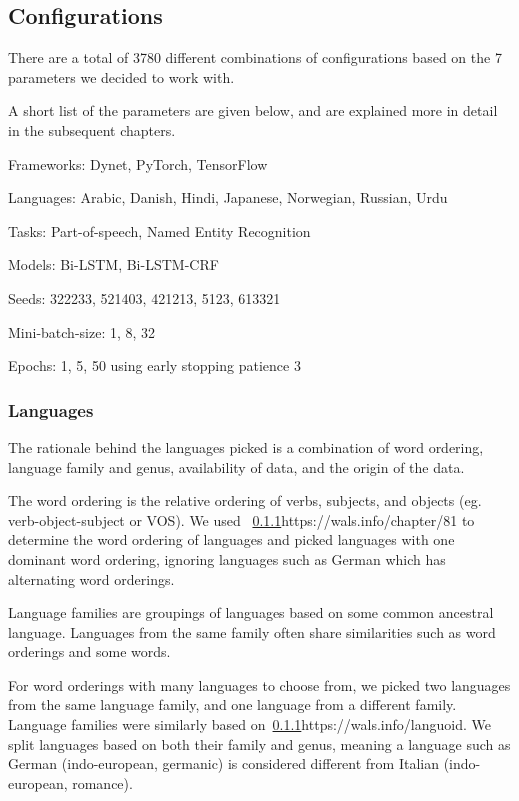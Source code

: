 
\subsection{Configurations}

There are a total of 3780 different combinations of configurations based on the
7 parameters we decided to work with. 

A short list of the parameters are given below, and are explained more in detail
in the subsequent chapters.

Frameworks: Dynet, PyTorch, TensorFlow

Languages: Arabic, Danish, Hindi, Japanese, Norwegian, Russian, Urdu

Tasks: Part-of-speech, Named Entity Recognition

Models: Bi-LSTM, Bi-LSTM-CRF

Seeds: 322233, 521403, 421213, 5123, 613321

Mini-batch-size: 1, 8, 32

Epochs: 1, 5, 50 using early stopping patience 3


\subsubsection{Languages}

The rationale behind the languages picked is a combination of word ordering,
language family and genus, availability of data, and the origin of the data.

The word ordering is the relative ordering of verbs, subjects, and objects (eg.
verb-object-subject or VOS). We used
~\ref{}{https://wals.info/chapter/81} to determine the word ordering of
languages and picked languages with one dominant word ordering, ignoring
languages such as German which has alternating word orderings. 

Language families are groupings of languages based on some common ancestral
language. Languages from the same family often share similarities such as word
orderings and some words. 

For word orderings with many languages to choose from, we picked two languages
from the same language family, and one language from a different family.
Language families were similarly based on~\ref{}{https://wals.info/languoid}. We
split languages based on both their family and genus, meaning a language such as
German (indo-european, germanic) is considered different from Italian
(indo-european, romance).

